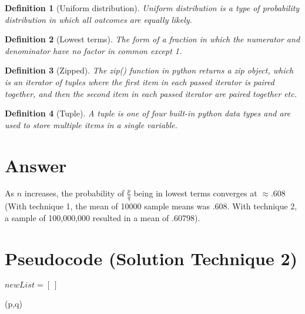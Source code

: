 \documentclass{article}
\newtheorem{definition}{Definition}
\begin{document}
\begin{definition}[Uniform distribution]
Uniform distribution is a type of probability distribution in which all outcomes are equally likely.
\end{definition}

\begin{definition}[Lowest terms]
The form of a fraction in which the numerator and denominator have no factor in common except 1.
\end{definition}

\begin{definition}[Zipped]
The zip() function in python returns a zip object, which is an iterator of tuples where the first item in each passed iterator is paired together, and then the second item in each passed iterator are paired together etc.
\end{definition}

\begin{definition}[Tuple]
A tuple is one of four built-in python data types and are used to store multiple items in a single variable.
\end{definition}

\section{Answer}

As $n$ increases, the probability of $\frac{p}{q}$ being in lowest terms converges at $\approx .608$ (With technique 1, the mean of 10000 sample means was .608. With technique 2, a sample of 100,000,000 resulted in a mean of .60798).


\section{Pseudocode (Solution Technique 2)}

\begin{algorithm}


    $newList = [\ ]$


        

    \caption{\lowestTermsCheck(p,q)}
\end{algorithm}
\end{document}
